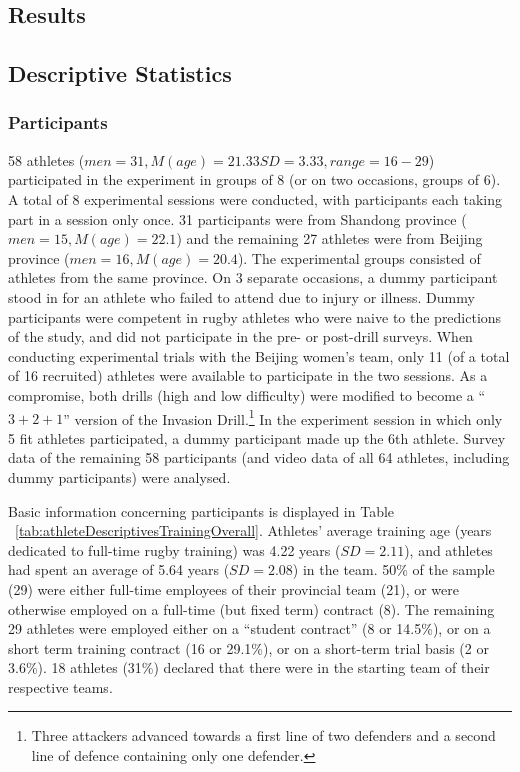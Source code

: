 \begin{CJK}{UTF8}{gbsn}
\clearpage
\section{Results}


\subsection{Descriptive Statistics \label{sec:descriptives}}

\subsubsection{Participants}
58 athletes ($men = 31, M(age) = 21.33 SD = 3.33, range = 16-29$) participated in the experiment in groups of 8 (or on two occasions, groups of 6).  A total of 8 experimental sessions were conducted, with participants each taking part in a session only once.  31 participants were from Shandong province ($men = 15, M(age) = 22.1$) and the remaining 27 athletes were from Beijing province ($men = 16, M(age) = 20.4$).  The experimental groups consisted of athletes from the same province. On 3 separate occasions, a dummy participant stood in for an athlete who failed to attend due to injury or illness.  Dummy participants were competent in rugby athletes who were naive to the predictions of the study, and did not participate in the pre- or post-drill surveys. When conducting experimental trials with the Beijing women's team, only 11 (of a total of 16 recruited) athletes were available to participate in the two sessions.  As a compromise, both drills (high and low difficulty) were modified to become a ``$3+2+1$'' version of the Invasion Drill.\footnote{Three attackers advanced towards a first line of two defenders and a second line of defence containing only one defender.} In the experiment session in which only 5 fit athletes participated, a dummy participant made up the 6th athlete.  Survey data of the remaining 58 participants (and video data of all 64 athletes, including dummy participants) were analysed.



Basic information concerning participants is displayed in Table ~\ref{tab:athleteDescriptivesTrainingOverall}.  Athletes' average training age (years dedicated to full-time rugby training) was 4.22 years ($SD = 2.11$), and athletes had spent an average of 5.64 years ($SD = 2.08$) in the team.  50\% of the sample (29) were either full-time employees of their provincial team (21), or were otherwise employed on a full-time (but fixed term) contract (8).  The remaining 29 athletes were employed either on a ``student contract'' (8 or 14.5\%), or on a short term training contract (16 or 29.1\%), or on a short-term trial basis (2 or 3.6\%).  18 athletes (31\%) declared that there were in the starting team of their respective teams.


\end{CJK}
